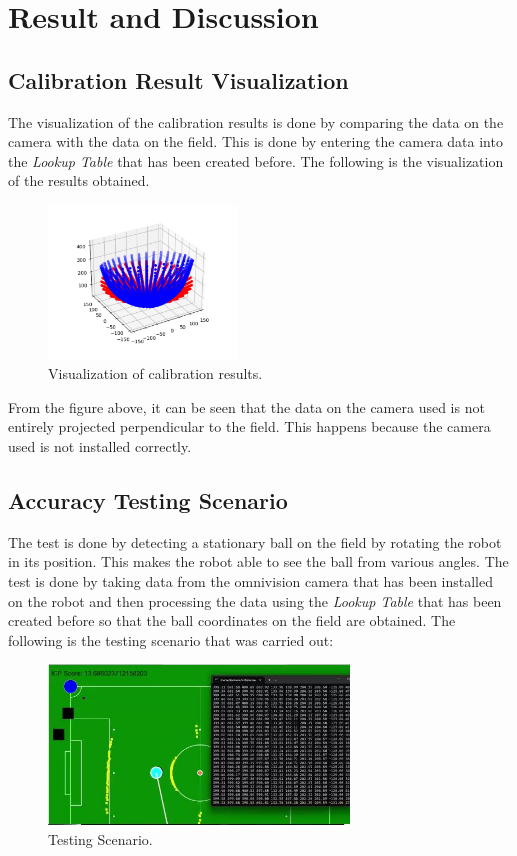 \section{Result and Discussion}
\label{sec:resultdiscussion}

\subsection{Calibration Result Visualization}
\label{sec:visualisasihasil}

The visualization of the calibration results is done by comparing the data on the camera with the data on the field. This is done by entering the camera data into the \emph{Lookup Table} that has been created before. The following is the visualization of the results obtained.

\begin{figure}[ht]
  \centering
  \includegraphics[width=5cm]{gambar/visual1.png}
  \caption{Visualization of calibration results.}
  \label{fig:hasilkalibrasi}
\end{figure}

From the figure above, it can be seen that the data on the camera used is not entirely projected perpendicular to the field. This happens because the camera used is not installed correctly.

\subsection{Accuracy Testing Scenario}
\label{sec:skenariopengujian}

The test is done by detecting a stationary ball on the field by rotating the robot in its position. This makes the robot able to see the ball from various angles. The test is done by taking data from the omnivision camera that has been installed on the robot and then processing the data using the \emph{Lookup Table} that has been created before so that the ball coordinates on the field are obtained. The following is the testing scenario that was carried out:

\begin{figure}[ht]
  \centering
  \includegraphics[width=8cm]{gambar/saat_putar_bola_2.jpeg}
  \caption{Testing Scenario.}
  \label{fig:skenariopengujian}
\end{figure}

